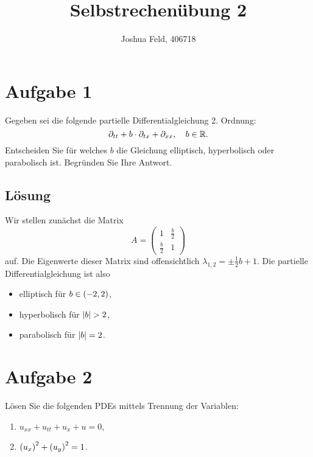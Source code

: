 \documentclass{exercise}
\institute{Applied and Computational Mathematics}
\title{Selbstrechenübung 2}
\author{Joshua Feld, 406718}
\begin{document}
    \maketitle


    \section*{Aufgabe 1}

    \begin{problem}
        Gegeben sei die folgende partielle Differentialgleichung 2. Ordnung:
        \[
            \partial_{tt} + b \cdot \partial_{tx} + \partial_{xx}, \quad b \in \R.
        \]
        Entscheiden Sie für welches \(b\) die Gleichung elliptisch, hyperbolisch oder parabolisch ist.
        Begründen Sie Ihre Antwort.
    \end{problem}

    \subsection*{Lösung}
    Wir stellen zunächst die Matrix
    \[
        A = \begin{pmatrix}
            1 & \frac{b}{2}\\
            \frac{b}{2} & 1
        \end{pmatrix}
    \]
    auf.
    Die Eigenwerte dieser Matrix sind offensichtlich \(\lambda_{1, 2} = \pm\frac{1}{2}b + 1\).
    Die partielle Differentialgleichung ist also
    \begin{itemize}
        \item elliptisch für \(b \in \parentheses*{-2, 2}\),
        \item hyperbolisch für \(\absolute*{b} > 2\),
        \item parabolisch für \(\absolute*{b} = 2\).
    \end{itemize}

    \section*{Aufgabe 2}

    \begin{problem}
        Lösen Sie die folgenden PDEs mittels Trennung der Variablen:
        \begin{enumerate}
            \item \(u_{xx} + u_{tt} + u_x + u = 0\),
            \item \(\parentheses*{u_x}^2 + \parentheses*{u_y}^2 = 1\). 
        \end{enumerate}
    \end{problem}
\end{document}
